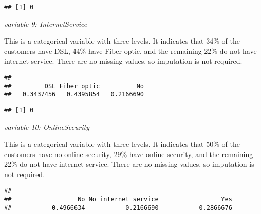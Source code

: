 \documentclass[
  a4paper]{article}
\newenvironment{Shaded}{\begin{snugshade}}{\end{snugshade}}
\newcommand{\CommentTok}[1]{\textcolor[rgb]{0.56,0.35,0.01}{\textit{#1}}}
\newcommand{\FunctionTok}[1]{\textcolor[rgb]{0.13,0.29,0.53}{\textbf{#1}}}
\newcommand{\NormalTok}[1]{#1}
\newcommand{\SpecialCharTok}[1]{\textcolor[rgb]{0.81,0.36,0.00}{\textbf{#1}}}
\begin{document}
\begin{verbatim}
## [1] 0
\end{verbatim}

\emph{variable 9: InternetService}

This is a categorical variable with three levels. It indicates that 34\%
of the customers have DSL, 44\% have Fiber optic, and the remaining 22\%
do not have internet service. There are no missing values, so imputation
is not required.

\begin{Shaded}
\end{Shaded}

\begin{verbatim}
## 
##         DSL Fiber optic          No 
##   0.3437456   0.4395854   0.2166690
\end{verbatim}

\begin{Shaded}
\end{Shaded}

\begin{verbatim}
## [1] 0
\end{verbatim}

\emph{variable 10: OnlineSecurity}

This is a categorical variable with three levels. It indicates that 50\%
of the customers have no online security, 29\% have online security, and
the remaining 22\% do not have internet service. There are no missing
values, so imputation is not required.

\begin{Shaded}
\end{Shaded}

\begin{verbatim}
## 
##                  No No internet service                 Yes 
##           0.4966634           0.2166690           0.2866676
\end{verbatim}
\end{document}
